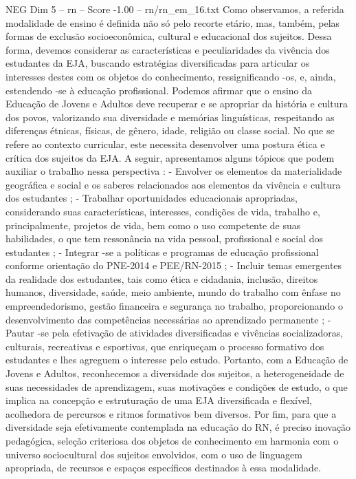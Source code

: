 \begin{textsample}{NEG Dim 5 – rn – Score -1.00 – rn/rn\_em\_16.txt}
Como observamos, a referida modalidade de ensino é definida não só pelo recorte etário, mas, também, pelas formas de exclusão socioeconômica, cultural e educacional dos sujeitos.
Dessa forma, devemos considerar as características e peculiaridades da vivência dos estudantes da EJA, buscando estratégias diversificadas para articular os interesses destes com os objetos do conhecimento, ressignificando -os, e, ainda, estendendo -se à educação profissional.
Podemos afirmar que o ensino da Educação de Jovens e Adultos deve recuperar e se apropriar da história e cultura dos povos, valorizando sua diversidade e memórias linguísticas, respeitando as diferenças étnicas, físicas, de gênero, idade, religião ou classe social.
No que se refere ao contexto curricular, este necessita desenvolver uma postura ética e crítica dos sujeitos da EJA.
A seguir, apresentamos alguns tópicos que podem auxiliar o trabalho nessa perspectiva : - Envolver os elementos da materialidade geográfica e social e os saberes relacionados aos elementos da vivência e cultura dos estudantes ; - Trabalhar oportunidades educacionais apropriadas, considerando suas características, interesses, condições de vida, trabalho e, principalmente, projetos de vida, bem como o uso competente de suas habilidades, o que tem ressonância na vida pessoal, profissional e social dos estudantes ; - Integrar -se a políticas e programas de educação profissional conforme orientação do PNE-2014 e PEE/RN-2015 ; - Incluir temas emergentes da realidade dos estudantes, tais como ética e cidadania, inclusão, direitos humanos, diversidade, saúde, meio ambiente, mundo do trabalho com ênfase no empreendedorismo, gestão financeira e segurança no trabalho, proporcionando o desenvolvimento das competências necessárias ao aprendizado permanente ; - Pautar -se pela efetivação de atividades diversificadas e vivências socializadoras, culturais, recreativas e esportivas, que enriqueçam o processo formativo dos estudantes e lhes agreguem o interesse pelo estudo.
Portanto, com a Educação de Jovens e Adultos, reconhecemos a diversidade dos sujeitos, a heterogeneidade de suas necessidades de aprendizagem, suas motivações e condições de estudo, o que implica na concepção e estruturação de uma EJA diversificada e flexível, acolhedora de percursos e ritmos formativos bem diversos.
Por fim, para que a diversidade seja efetivamente contemplada na educação do RN, é preciso inovação pedagógica, seleção criteriosa dos objetos de conhecimento em harmonia com o universo sociocultural dos sujeitos envolvidos, com o uso de linguagem apropriada, de recursos e espaços específicos destinados à essa modalidade.

\end{textsample}
